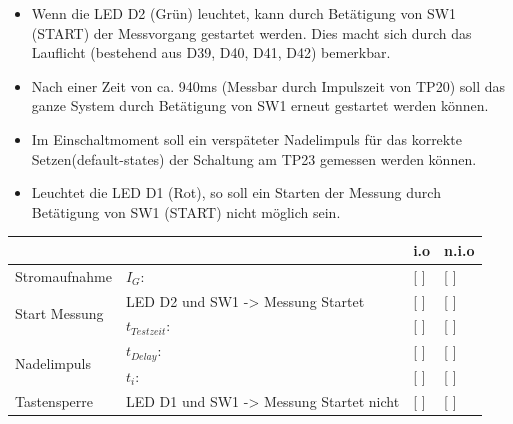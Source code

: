 
\begin{itemize}
	\item{Wenn die LED D2 (Grün) leuchtet, kann durch Betätigung von SW1 (START) der Messvorgang gestartet werden. Dies macht sich durch das Lauflicht (bestehend aus D39, D40, D41, D42) bemerkbar.}
	
	\item{Nach einer Zeit von ca. 940ms (Messbar durch Impulszeit von TP20) soll das ganze System durch Betätigung von SW1 erneut gestartet werden können.}
	
	\item{Im Einschaltmoment soll ein verspäteter Nadelimpuls für das korrekte Setzen(default-states) der Schaltung am TP23 gemessen werden können.}
	
	 \item{Leuchtet die LED D1 (Rot), so soll ein Starten der Messung durch Betätigung von SW1 (START) nicht möglich sein.}
\end{itemize}


\renewcommand{\arraystretch}{2}
\begin{tabularx}{\textwidth}{p{}| p{} | p{} | p{}}

 &  & i.o & n.i.o \\

\hline

Stromaufnahme & $I_{G}$: & [ ] & [ ] \\

\hline

\multirow{2}{*}{Start Messung}
		& LED D2 und SW1 -> Messung Startet		 							& [ ] & [ ] \\
		& $t_{Testzeit}$:														& [ ] & [ ] \\

\hline

\multirow{2}{*}{Nadelimpuls}
		& $t_{Delay}$:				&	[ ] & [ ] 	\\
		& $t_{i}$: 					&	[ ]	& [ ] 	\\
		
\hline

Tastensperre & LED D1 und SW1 -> Messung Startet nicht & [ ] & [ ] \\
		
\end{tabularx}
\renewcommand{\arraystretch}{1}

